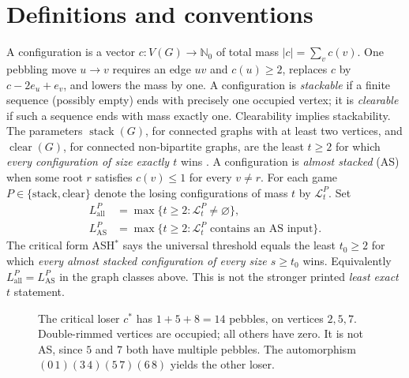 \documentclass[10pt,a4paper]{article}
\newcommand{\Gcoords}{%
\coordinate (v0) at (-2.8,0);\coordinate (v3) at (-.8,0);
\coordinate (v5) at (-1.8,1.2);\coordinate (v6) at (-1.8,-1.2);
\coordinate (v1) at (2.6,0);\coordinate (v4) at (4.6,0);
\coordinate (v7) at (3.6,1.2);\coordinate (v8) at (3.6,-1.2);
\coordinate (v2) at (.9,-2.5);}
\newcommand{\Gedges}{\foreach \a/\b in {0/3,0/5,0/6,1/4,1/7,1/8,2/6,2/8,3/5,3/6,4/7,4/8,5/7,6/8}{\draw[line width=.7pt] (v\a)--(v\b);}}
\newcommand{\Gvertices}{\foreach \i in {0,1,2,3,4,5,6,7,8}{\node[draw,fill=white,circle,inner sep=0pt,minimum size=7mm,font=\small\bfseries] at (v\i) {\i};}}
\begin{document}
\section{Definitions and conventions}
A configuration is a vector \(c:V(G)\to\mathbb{N}_0\) of total mass \(|c|=\sum_v c(v)\). One pebbling move \(u\to v\) requires an edge \(uv\) and \(c(u)\ge2\), replaces \(c\) by \(c-2e_u+e_v\), and lowers the mass by one. A configuration is \emph{stackable} if a finite sequence (possibly empty) ends with precisely one occupied vertex; it is \emph{clearable} if such a sequence ends with mass exactly one. Clearability implies stackability. The parameters \(\operatorname{stack}(G)\), for connected graphs with at least two vertices, and \(\operatorname{clear}(G)\), for connected non-bipartite graphs, are the least \(t\ge2\) for which \emph{every configuration of size exactly \(t\)} wins \cite{CSApril}.
A configuration is \emph{almost stacked} (AS) when some root \(r\) satisfies \(c(v)\le1\) for every \(v\ne r\). For each game \(P\in\{\mathrm{stack},\mathrm{clear}\}\) denote the losing configurations of mass \(t\) by \(\mathcal{L}_t^P\). Set
\begin{align*}
L_{\mathrm{all}}^P&=\max\{t\ge2:\mathcal{L}_t^P\ne\varnothing\},\\
L_{\mathrm{AS}}^P&=\max\{t\ge2:\mathcal{L}_t^P\text{ contains an AS input}\}.
\end{align*}
The critical form ASH$^*$ says the universal threshold equals the least \(t_0\ge2\) for which \emph{every almost stacked configuration of every size \(s\ge t_0\)} wins. Equivalently \(L_{\mathrm{all}}^P=L_{\mathrm{AS}}^P\) in the graph classes above. This is not the stronger printed \emph{least exact \(t\)} statement.
\begin{figure}[H]\centering
{}
\caption{The critical loser \(c^*\) has \(1+5+8=14\) pebbles, on vertices \(2,5,7\). Double-rimmed vertices are occupied; all others have zero. It is not AS, since \(5\) and \(7\) both have multiple pebbles. The automorphism \((0\,1)(3\,4)(5\,7)(6\,8)\) yields the other loser.}\label{fig:loser}
\end{figure}
\end{document}
